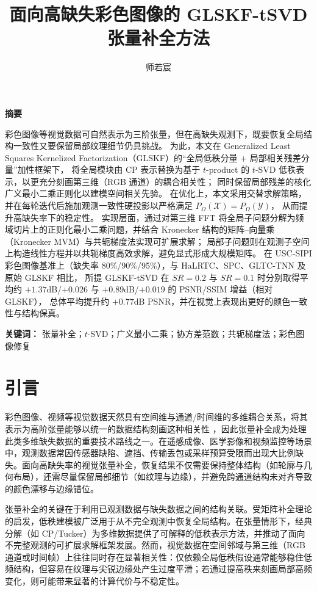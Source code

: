 \documentclass[UTF8]{ctexart}
\renewcommand{\abstractname}{\zihao{-3} 摘要}
\renewenvironment{abstract}{
  \par\begin{center}\bfseries\abstractname\end{center}
  \par\noindent\zihao{-4}
  \setstretch{1.25}
}{
  \par
}
\begin{document}
\title{面向高缺失彩色图像的 GLSKF-tSVD 张量补全方法}
\author{师若宸} 
\date{} 
\maketitle
\begin{abstract}

彩色图像等视觉数据可自然表示为三阶张量，但在高缺失观测下，既要恢复全局结构一致性又要保留局部纹理细节仍具挑战。
为此，本文在 Generalized Least Squares Kernelized Factorization（GLSKF）的“全局低秩分量 + 局部相关残差分量”加性框架下，
将全局模块由 CP 表示替换为基于 $t$-product 的 $t$-SVD 低秩表示，以更充分刻画第三维（RGB 通道）的耦合相关性；
同时保留局部残差的核化广义最小二乘正则化以建模空间相关先验。
在优化上，本文采用交替求解策略，并在每轮迭代后施加观测一致性硬投影以严格满足 $P_{\Omega}(\mathcal{X})=P_{\Omega}(\mathcal{Y})$，
从而提升高缺失率下的稳定性。
实现层面，通过对第三维 FFT 将全局子问题分解为频域切片上的正则化最小二乘问题，并结合 Kronecker 结构的矩阵–向量乘（Kronecker MVM）与共轭梯度法实现可扩展求解；
局部子问题则在观测子空间上构造线性方程并以共轭梯度高效求解，避免显式形成大规模矩阵。
在 USC-SIPI 彩色图像基准上（缺失率 80\%/90\%/95\%），与 HaLRTC、SPC、GLTC-TNN 及原始 GLSKF 相比，
所提 GLSKF-tSVD 在 $SR=0.2$ 与 $SR=0.1$ 时分别取得平均约 $+1.37$dB/$+0.026$ 与 $+0.89$dB/$+0.019$ 的 PSNR/SSIM 增益（相对 GLSKF），
总体平均提升约 $+0.77$dB PSNR，并在视觉上表现出更好的颜色一致性与结构保真。

\end{abstract}
\par\noindent\textbf{关键词：} 张量补全；$t$-SVD；广义最小二乘；协方差范数；共轭梯度法；彩色图像修复


\section{引言}
彩色图像、视频等视觉数据天然具有空间维与通道/时间维的多维耦合关系，将其表示为高阶张量能够以统一的数据结构刻画这种相关性 ，因此张量补全成为处理此类多维缺失数据的重要技术路线之一\cite{liu2013tensor}。在遥感成像、医学影像和视频监控等场景中，观测数据常因传感器缺陷、遮挡、传输丢包或采样预算受限而出现大比例缺失\cite{bengua2017tt,li2017tv}。面向高缺失率的视觉张量补全，恢复结果不仅需要保持整体结构（如轮廓与几何布局），还需尽量保留局部细节（如纹理与边缘），并避免跨通道结构未对齐导致的颜色漂移与边缘错位\cite{zhao2021complementary}。

张量补全的关键在于利用已观测数据与缺失数据之间的结构关联。受矩阵补全理论的启发，低秩建模被广泛用于从不完全观测中恢复全局结构\cite{candes2009matrix}。在张量情形下，经典分解（如 CP/Tucker）为多维数据提供了可解释的低秩表示方法\cite{kolda2009tensor}，并推动了面向不完整观测的可扩展求解框架发展\cite{acar2011scalable}。然而，视觉数据在空间邻域与第三维（RGB 通道或时间帧）上往往同时存在显著相关性：仅依赖全局低秩假设通常能够稳住低频结构，但容易在纹理与尖锐边缘处产生过度平滑；若通过提高秩来刻画局部高频变化，则可能带来显著的计算代价与不稳定性。
\end{document}

